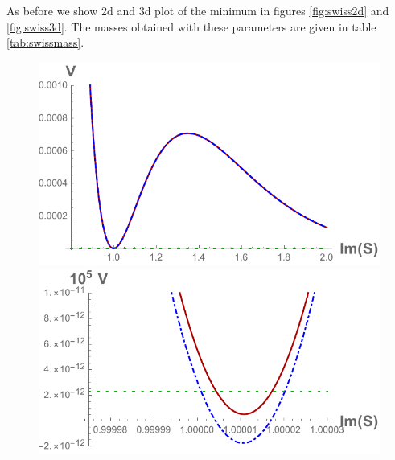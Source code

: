 \documentclass[a4paper,12pt]{report}
\begin{document}
As before we show 2d and 3d plot of the minimum in figures \ref{fig:swiss2d} and \ref{fig:swiss3d}. The masses obtained with these parameters are given in table \ref{tab:swissmass}.

\begin{figure}[H]
\centering
\includegraphics[scale=0.55]{quevedo_38_S_large.pdf}\qquad\includegraphics[scale=0.59]{quevedo_38_S_close.pdf}\\

\end{figure}
\end{document}
